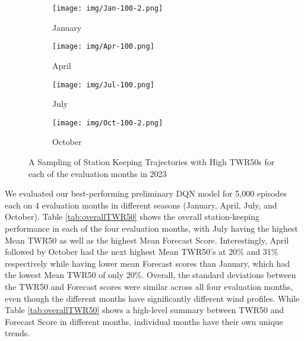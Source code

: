 


\begin{figure*}[!b]  %
  \centering
  \begin{subfigure}[t]{0.25\textwidth}  %
    \centering
    \texttt{[image: img/Jan-100-2.png]}  
    \caption{January} \label{fig1}
  \end{subfigure}%
  \begin{subfigure}[t]{0.25\textwidth}  %
    \centering
    \texttt{[image: img/Apr-100.png]}  
    \caption{April} \label{fig2}
  \end{subfigure}%
  \begin{subfigure}[t]{0.25\textwidth}  %
    \centering
    \texttt{[image: img/Jul-100.png]}  
    \caption{July} \label{fig3}
  \end{subfigure}%
  \begin{subfigure}[t]{0.25\textwidth}  %
    \centering
    \texttt{[image: img/Oct-100-2.png]}
    \caption{October} \label{fig4}
  \end{subfigure}

\caption{A Sampling of Station Keeping Trajectories with High TWR50s for each of the evaluation months in 2023}
\label{fig:Trajectories}
\end{figure*}

We evaluated our best-performing preliminary DQN model for 5,000 episodes each on 4 evaluation months in different seasons (January, April, July, and October). Table \ref{tab:overallTWR50} shows the overall station-keeping performance in each of the four evaluation months, with July having the highest Mean TWR50 as well as the highest Mean Forecast Score. Interestingly, April followed by October had the next highest Mean TWR50's at 20\% and 31\% respectively while having lower mean Forecast scores than January, which had the lowest Mean TWR50 of only 20\%. Overall, the standard deviations between the TWR50 and Forecast scores were similar across all four evaluation months, even though the different months have significantly different wind profiles. While Table \ref{tab:overallTWR50} shows a high-level summary between TWR50 and Forecast Score in different months, individual months have their own unique trends. 


